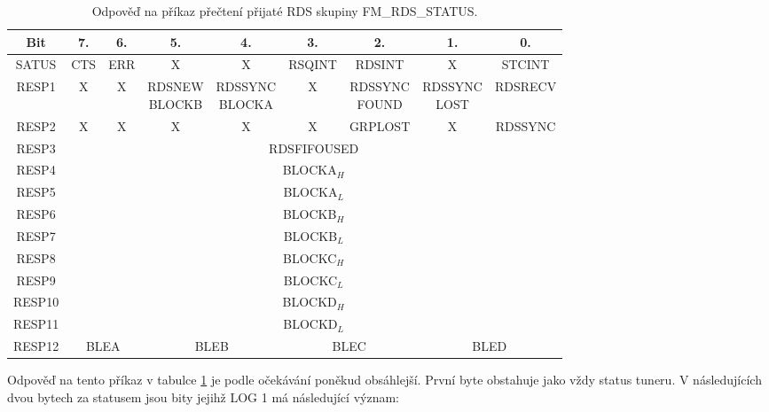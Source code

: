 \begin{table}[ht!]
\footnotesize 
\begin{center}
\begin{tabular}{|c|c|c|c|c|c|c|c|c|}
\hline 
Bit & 7. & 6. & 5. & 4. & 3. & 2. & 1. & 0. \\ 
\hline 
SATUS & CTS & ERR & X & X & RSQINT & RDSINT & X & STCINT \\ 
\hline 
RESP1 & X & X & \makecell{RDSNEW\\BLOCKB} & \makecell{RDSSYNC\\BLOCKA} & X & \makecell{RDSSYNC\\FOUND} & \makecell{RDSSYNC\\LOST} & RDSRECV \\ 
\hline
RESP2 & X & X & X & X & X & GRPLOST & X & RDSSYNC \\
\hline 
RESP3 & \multicolumn{8}{c|}{RDSFIFOUSED} \\ 
\hline 
RESP4 & \multicolumn{8}{c|}{BLOCKA$_{{H}}$} \\ 
\hline 
RESP5 & \multicolumn{8}{c|}{BLOCKA$_{{L}}$} \\
\hline 
RESP6 & \multicolumn{8}{c|}{BLOCKB$_{{H}}$} \\ 
\hline 
RESP7 & \multicolumn{8}{c|}{BLOCKB$_{{L}}$} \\ 
\hline 
RESP8 & \multicolumn{8}{c|}{BLOCKC$_{{H}}$} \\ 
\hline 
RESP9 & \multicolumn{8}{c|}{BLOCKC$_{{L}}$} \\ 
\hline 
RESP10 & \multicolumn{8}{c|}{BLOCKD$_{{H}}$} \\ 
\hline 
RESP11 & \multicolumn{8}{c|}{BLOCKD$_{{L}}$} \\ 
\hline 
RESP12 & \multicolumn{2}{c|}{BLEA} & \multicolumn{2}{c|}{BLEB} & \multicolumn{2}{c|}{BLEC} & \multicolumn{2}{c|}{BLED} \\ 
\hline 
\end{tabular} 
\end{center}
\caption{Odpověď na příkaz přečtení přijaté RDS skupiny FM\_RDS\_STATUS.}
\label{tab:tuner-rds-get-resp} 
\end{table}

Odpověď na tento příkaz v tabulce \ref{tab:tuner-rds-get-resp} je podle očekávání poněkud obsáhlejší. První byte obstahuje jako vždy status tuneru. V následujících dvou bytech za statusem jsou bity jejihž LOG 1 má následující význam:

